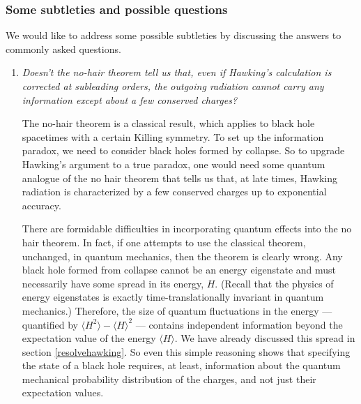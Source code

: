 \documentclass[12pt]{article}
\begin{document}
\subsubsection{Some subtleties and possible questions \label{oldinfosubtle}}
We would like to address some possible subtleties by discussing the answers to commonly asked questions.
\begin{enumerate}[label={\bf Q\arabic*}, series=qseries]
\item
{\em Doesn't the no-hair theorem tell us that, even if Hawking's calculation is corrected at subleading orders, the outgoing radiation cannot carry any information except about a few conserved charges?}

The no-hair theorem  is a classical result,
 which applies to black hole spacetimes with a certain Killing symmetry. To set up the information paradox, we need to consider black holes formed by collapse. So to upgrade Hawking's argument to a true paradox, one would need some quantum analogue of the no hair theorem that tells us that, at late times, Hawking radiation is characterized by
a few conserved charges up to exponential accuracy.

There are formidable difficulties in incorporating quantum effects into the no hair theorem. In fact, if one attempts to use the classical theorem, unchanged, in quantum mechanics, then the theorem is clearly wrong. Any black hole formed from collapse cannot be an energy eigenstate and must necessarily have some spread in its energy, $H$. (Recall that the physics of energy eigenstates is exactly time-translationally invariant in quantum mechanics.)  Therefore, the size of quantum fluctuations in the energy --- quantified by $\langle H^2 \rangle - \langle H \rangle^2$  --- contains independent information beyond the expectation value of the energy $\langle H \rangle$. We have already discussed this spread in section \ref{resolvehawking}.
So even this simple reasoning shows that specifying the state of a black hole  requires, at least,  information about the quantum mechanical probability distribution of the charges, and not just their expectation values.


\end{enumerate}
\end{document}
